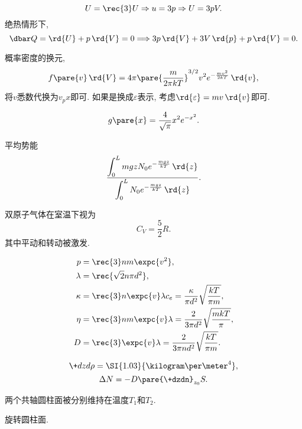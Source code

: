 \documentclass[hidelinks]{ctexart}
\begin{document}
\begin{ex}[4.7]
    \[ U = \rec{3} U \Rightarrow u = 3p \Rightarrow U = 3pV. \]
    绝热情形下,
    \[ \dbar Q = \rd{U} + p\,\rd{V} = 0 \Longrightarrow 3p\,\rd{V} + 3V\,\rd{p} + p\,\rd{V} = 0. \]
\end{ex}
\begin{ex}[4.8]
    概率密度的换元,
    \[ f\pare{v}\,\rd{V} = 4\pi \pare{\frac{m}{2\pi kT}}^{3/2} v^2 e^{-\frac{mv^2}{2kT}}\,\rd{v}, \]
    将$v$悉数代换为$v_p x$即可. 如果是换成$\varepsilon$表示, 考虑$\rd{\varepsilon} = mv\,\rd{v}$即可.
\end{ex}
\begin{finale}
    \[ g\pare{x} = \frac{4}{\sqrt{\pi}}x^2 e^{-x^2}. \]
\end{finale}
\begin{ex}[4.12]
    平均势能
    \[ \frac{\displaystyle\int_0^L mgz N_0 e^{-\frac{mgz}{kT}}\,\rd{z}}{\displaystyle\int_0^L N_0 e^{-\frac{mgz}{kT}}\,\rd{z}}. \]
\end{ex}
\begin{finale}
    双原子气体在室温下视为
    \[ C_V = \frac{5}{2}R. \]
    其中平动和转动被激发.
\end{finale}
\begin{finale}
    \begin{align*}
        p &= \rec{3}nm\expc{v^2},\\
        \lambda &= \rec{\sqrt{2}n\pi d^2},\\
        \kappa &= \rec{3} n\expc{v}\lambda c_e = \frac{\kappa}{\pi d^2} \sqrt{\frac{kT}{\pi m}},\\
        \eta &= \rec{3} nm\expc{v}\lambda = \frac{2}{3\pi d^2} \sqrt{\frac{mkT}{\pi}}, \\
        D &= \rec{3}\expc{v}\lambda = \frac{2}{3\pi nd^2}\sqrt{\frac{kT}{\pi m}}.
    \end{align*}
\end{finale}
\begin{figure}[ht]
    \centering
\end{figure}
\begin{ex}[5.5]
    \[ \+dzd\rho = \SI{1.03}{\kilogram\per\meter^4}, \]
    \[ \Delta N = -D\pare{\+dzdn}_{z_0} S. \]
\end{ex}
\begin{figure}[ht]
    \centering
\end{figure}
\begin{ex}[5.7]
    两个共轴圆柱面被分别维持在温度$T_1$和$T_2$.
\end{ex}
\begin{figure}[ht]
    \centering
\end{figure}
\begin{ex}
    旋转圆柱面.
\end{ex}
\end{document}
